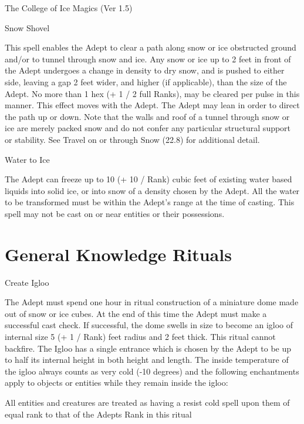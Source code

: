 \begin{Chapter}{The College of Ice Magics (Ver 1.5)}
\begin{spell}[G-7]{Snow Shovel}
\begin{effects}
This spell enables the Adept to clear a path along snow or ice
obstructed ground and/or to tunnel through snow and ice.  Any snow or
ice up to 2 feet in front of the Adept undergoes a change in density
to dry snow, and is pushed to either side, leaving a gap 2 feet wider,
and higher (if applicable), than the size of the Adept.  No more than
1 hex (+ 1 / 2 full Ranks), may be cleared per pulse in this manner.
This effect moves with the Adept.  The Adept may lean in order to
direct the path up or down.  Note that the walls and roof of a tunnel
through snow or ice are merely packed snow and do not confer any
particular structural support or stability. See Travel on or through
Snow (22.8) for additional detail.
\end{effects}
\end{spell}

\begin{spell}[G-8]{Water to Ice}
\begin{effects}
The Adept can freeze up to 10 (+ 10 / Rank) cubic feet of existing
water based liquids into solid ice, or into snow of a density chosen
by the Adept. All the water to be transformed must be within the
Adept’s range at the time of casting.  This spell may not be cast on
or near entities or their possessions.
\end{effects}
\end{spell}

\section{General Knowledge Rituals}

\begin{ritual}[Q-1]{Create Igloo}
\begin{effects}
The Adept must spend one hour in ritual construction of a miniature
dome made out of snow or ice cubes. At the end of this time the Adept
must make a successful cast check.  If successful, the dome swells in
size to become an igloo of internal size 5 (+ 1 / Rank) feet radius
and 2 feet thick. This ritual cannot backfire.  The Igloo has a single
entrance which is chosen by the Adept to be up to half its internal
height in both height and length.  The inside temperature of the igloo
always counts as very cold (-10 degrees) and the following
enchantments apply to objects or entities while they remain inside the
igloo:
\begin{Itemize}
\item All entities and creatures are treated as having a resist cold
  spell upon them of equal rank to that of the Adepts Rank in this
  ritual


\end{Itemize}
\end{effects}
\end{ritual}
\end{Chapter}
